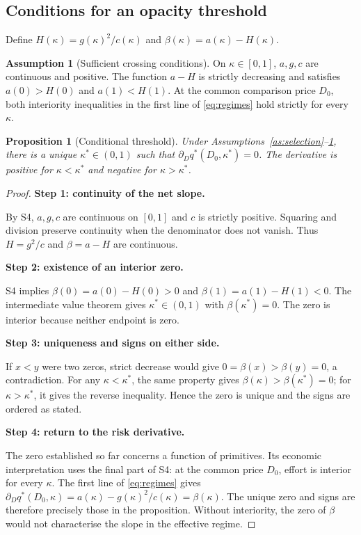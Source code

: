 \documentclass[11pt]{article}
\newtheorem{proposition}{Proposition}
\theoremstyle{definition}\newtheorem{assumption}{Assumption}
\begin{document}
\subsection{Conditions for an opacity threshold}
Define $H(\kappa)=g(\kappa)^2/c(\kappa)$ and
$\beta(\kappa)=a(\kappa)-H(\kappa)$.
\begin{assumption}[Sufficient crossing conditions]\label{as:cross}
On $\kappa\in[0,1]$, $a,g,c$ are continuous and positive. The function
$a-H$ is strictly decreasing and satisfies $a(0)>H(0)$ and $a(1)<H(1)$.
At the common comparison price $D_0$, both interiority inequalities in the
first line of \eqref{eq:regimes} hold strictly for every $\kappa$.
\end{assumption}
\begin{proposition}[Conditional threshold]\label{p:threshold}
Under Assumptions~\ref{as:selection}--\ref{as:cross}, there is a unique
$\kappa^*\in(0,1)$ such that $\partial_Dq^*(D_0,\kappa^*)=0$. The
derivative is positive for $\kappa<\kappa^*$ and negative for $\kappa>\kappa^*$.
\end{proposition}
\begin{proof}
\textbf{Step 1: continuity of the net slope.}\par
By S4, $a,g,c$ are continuous on $[0,1]$ and $c$ is strictly positive.
Squaring and division preserve continuity when the denominator does not
vanish. Thus $H=g^2/c$ and $\beta=a-H$ are continuous.

\textbf{Step 2: existence of an interior zero.}\par
S4 implies $\beta(0)=a(0)-H(0)>0$ and $\beta(1)=a(1)-H(1)<0$. The
intermediate value theorem gives $\kappa^*\in(0,1)$ with
$\beta(\kappa^*)=0$. The zero is interior because neither endpoint is zero.

\textbf{Step 3: uniqueness and signs on either side.}\par
If $x<y$ were two zeros, strict decrease would give
$0=\beta(x)>\beta(y)=0$, a contradiction. For any $\kappa<\kappa^*$,
the same property gives $\beta(\kappa)>\beta(\kappa^*)=0$; for
$\kappa>\kappa^*$, it gives the reverse inequality. Hence the zero is
unique and the signs are ordered as stated.

\textbf{Step 4: return to the risk derivative.}\par
The zero established so far concerns a function of primitives. Its economic
interpretation uses the final part of S4: at the common price $D_0$, effort
is interior for every $\kappa$. The first line of \eqref{eq:regimes} gives
$\partial_Dq^*(D_0,\kappa)=a(\kappa)-g(\kappa)^2/c(\kappa)=\beta(\kappa)$.
The unique zero and signs are therefore precisely those in the proposition.
Without interiority, the zero of $\beta$ would not characterise the slope
in the effective regime.
\end{proof}
\end{document}
